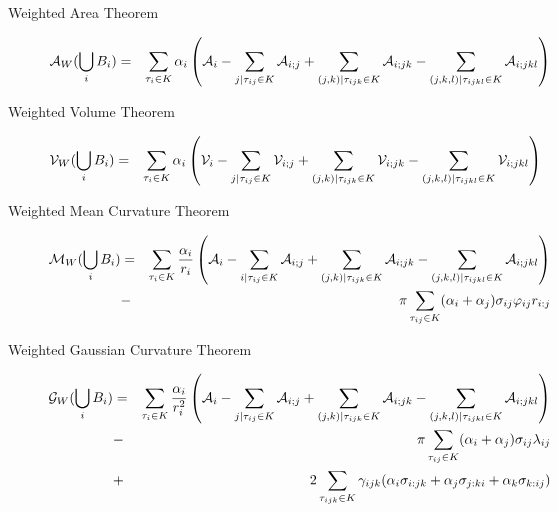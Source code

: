 \documentclass[11 pt]{article}
\newcommand {\mm}[1] {\ifmmode{#1}\else{\mbox{\(#1\)}}\fi}
\theoremstyle{plain} \theorembodyfont{\rmfamily}
\newcommand{\tsx}           {\mm{\tau}}
\begin{document}
\begin{description}
  \item[{\sc Weighted Area Theorem}]
    \begin{eqnarray}
    \mathcal{A}_W(\bigcup_i B_i) &=& \sum_{\tsx_i \in K} \alpha_i \left(\mathcal{A}_i
    - \sum_{j | \tsx_{ij} \in K} \mathcal{A}_{i;j} 
    + \sum_{(j,k) | \tsx_{ijk} \in K}  \mathcal{A}_{i;jk}  - \sum_{(j,k,l) | \tsx_{ijkl} \in K} \mathcal{A}_{i;jkl} \right) \nonumber \\
          \label{eqn:wsurf}
          \end{eqnarray}
\end{description}
\begin{description}
  \item[{\sc Weighted Volume Theorem}]
    \begin{eqnarray}
    \mathcal{V}_W(\bigcup_i B_i) &=& \sum_{\tsx_i \in K} \alpha_i \left( \mathcal{V}_i
    - \sum_{j | \tsx_{ij} \in K} \mathcal{V}_{i;j} 
    + \sum_{(j,k) | \tsx_{ijk} \in K} \mathcal{V}_{i;jk}  - \sum_{(j,k,l) | \tsx_{ijkl} \in K} \mathcal{V}_{i;jkl} \right) \nonumber \\
          \label{eqn:wvol}
          \end{eqnarray}
\end{description}
\begin{description}
  \item[{\sc Weighted Mean Curvature Theorem}]
    \begin{eqnarray}
    \mathcal{M}_W(\bigcup_i B_i) &=& \sum_{\tsx_i \in K} \frac{\alpha_i}{r_i} \left(\mathcal{A}_i
    - \sum_{i | \tsx_{ij} \in K} \mathcal{A}_{i;j} 
    + \sum_{(j,k) | \tsx_{ijk} \in K}  \mathcal{A}_{i;jk}  - \sum_{(j,k,l) | \tsx_{ijkl} \in K} \mathcal{A}_{i;jkl} \right) \nonumber \\
    &-&  \pi \sum_{\tsx_{ij} \in K} (\alpha_i+\alpha_j) \sigma_{ij} \varphi_{ij} r_{i:j}
          \label{eqn:wmean}
          \end{eqnarray}
\end{description}
\begin{description}
  \item[{\sc Weighted Gaussian Curvature Theorem}]
    \begin{eqnarray}
    \mathcal{G}_W(\bigcup_i B_i) &=& \sum_{\tsx_i \in K} \frac{\alpha_i}{r_i^2} \left(\mathcal{A}_i
    - \sum_{j | \tsx_{ij} \in K} \mathcal{A}_{i;j} 
    + \sum_{(j,k) | \tsx_{ijk} \in K}  \mathcal{A}_{i;jk}  - \sum_{(j,k,l) | \tsx_{ijkl} \in K} \mathcal{A}_{i;jkl} \right) \nonumber \\
    &-&  \pi \sum_{\tsx_{ij} \in K} (\alpha_i+\alpha_j) \sigma_{ij} \lambda_{ij} \nonumber \\
    &+& 2 \sum_{\tsx_{ijk} \in K} \gamma_{ijk} (\alpha_i \sigma_{i:jk} + \alpha_j \sigma_{j:ki} + \alpha_k \sigma_{k: ij} )  \nonumber \\
          \label{eqn:wgauss}
          \end{eqnarray}
\end{description}
\end{document}
